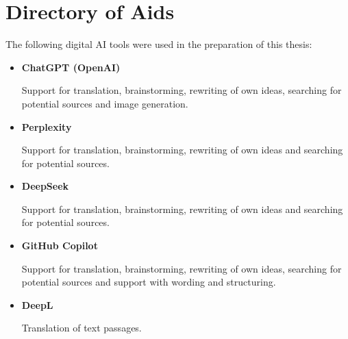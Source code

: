 \chapter*{Directory of Aids}

The following digital \ac{AI} tools were used in the preparation of this thesis:

\begin{itemize}

    \item \textbf{ChatGPT (OpenAI) \cite{ChatGPT}}

    Support for translation, brainstorming, rewriting of own ideas, searching for potential sources and image generation.

    \item \textbf{Perplexity \cite{Perplexity}}
    
    Support for translation, brainstorming, rewriting of own ideas and searching for potential sources.

    \item \textbf{DeepSeek \cite{DeepSeek}}

    Support for translation, brainstorming, rewriting of own ideas and searching for potential sources.

    \item \textbf{GitHub Copilot \cite{GitHubCopilotDein}}

    Support for translation, brainstorming, rewriting of own ideas, searching for potential sources and support with wording and structuring.

    \item \textbf{DeepL \cite{DeepLUbersetzerPraziseste}}

    Translation of text passages.

\end{itemize}

